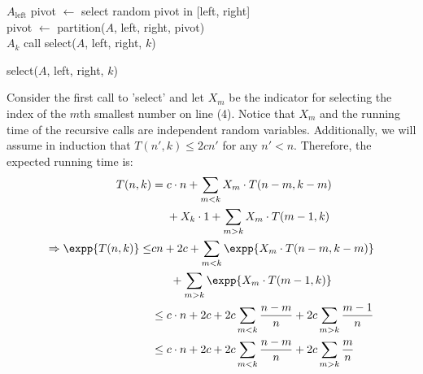 \begin{algorithm}
 { 
  \Return $A_{\text{left}}$
  }
  pivot $\leftarrow$ select random pivot in [left, right]\\
  pivot $\leftarrow$ partition($A$, left, right, pivot) \\
   {
    \Return $A_{k}$
  }
  \Return call select($A$, left, right,  $k$)

  \caption{select($A$, left, right,  $k$)}
\end{algorithm}
Consider the first call to 'select' and let $X_m$ be the indicator for selecting the index of the $m$th smallest number on line (4). Notice that $X_m$ and the running time of the recursive calls are independent random variables. Additionally, we will assume in induction that $T(n', k) \le 2cn'$ for any $n' < n$. Therefore, the expected running time is:
\begin{equation*}
  \begin{split}
    T(n,k) &= c\cdot n + \sum_{m < k}{ X_{m} \cdot T(n-m, k -m)} \\ 
    & \ \ \ \ + X_{k} \cdot 1  + \sum_{m > k}{ X_{m} \cdot T(m-1, k)} \\ 
     \Rightarrow \expp{T(n,k)} \le & cn +2c  + \sum_{m < k}{ \expp{X_{m} \cdot T(n-m, k -m)}} \\
    & \ \ \ \  \  + \sum_{m > k}{\expp{ X_{m} \cdot T(m-1, k) }} \\ 
    & \le c\cdot n + 2c +  2c \sum_{m < k}{ \frac{n-m}{n} }  + 2c\sum_{m > k}{ \frac{m-1}{n}} \\
    & \le c\cdot n + 2c +  2c \sum_{m < k}{ \frac{n-m}{n} }  + 2c\sum_{m > k}{ \frac{m}{n}} 
  \end{split}
\end{equation*}

